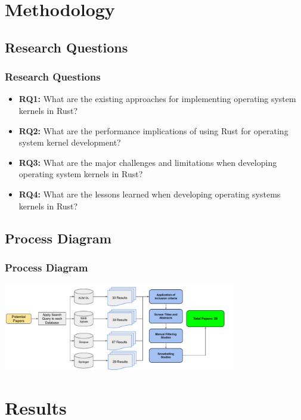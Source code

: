 \documentclass{beamer}
\begin{document}
\section{Methodology}

\subsection{Research Questions}
\begin{frame}
  \frametitle{Research Questions}
  \begin{itemize}
  \item<1-> \textbf{RQ1:} What are the existing approaches for implementing operating system kernels in Rust?
  \item<2-> \textbf{RQ2:} What are the performance implications of using Rust for operating system kernel development?
  \item<3-> \textbf{RQ3:} What are the major challenges and limitations when developing operating system kernels in Rust?
  \item<4-> \textbf{RQ4:} What are the lessons learned when developing operating systems kernels in Rust?

  \end{itemize}
\end{frame}

\subsection{Process Diagram}
\begin{frame}
  \frametitle{Process Diagram}
  \includegraphics[width=4in]{figures/process-diagram.pdf}
\end{frame}
\section{Results}
\end{document}
